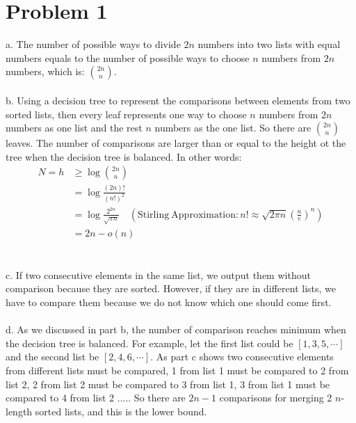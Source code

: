 \documentclass[twoside,11pt]{homework}
\begin{document}
\maketitle

\section*{Problem 1}
a. The number of possible ways to divide $2n$ numbers into two lists with equal numbers equals to the number of possible ways to choose $n$ numbers from $2n$ numbers, which is:
$\binom{2n}{n}$.
\\\\
b. Using a decision tree to represent the comparisons between elements from two sorted lists, then every leaf represents one way to choose $n$ numbers from $2n$ numbers as one list and the rest $n$ numbers as the one list.
So there are $\binom{2n}{n}$ leaves.
The number of comparisons are larger than or equal to the height ot the tree when the decision tree is balanced.
In other words:
%
\begin{equation}
\begin{split}
N = h & \ge \log \binom{2n}{n} \\
	&= \log \frac{(2n)!}{(n!)^2} \\
	&= \log \frac{2^{2n}}{\sqrt{\pi n }} \quad (\mathrm{Stirling\ Approximation}:  n! \approx \sqrt{2\pi n} (\frac{n}{e})^n) \\
	&= 2n - o(n)
\end{split}
\end{equation}
%
\\\\
c. If two consecutive elements in the same list, we output them without comparison because they are sorted.
However, if they are in different lists, we have to compare them because we do not know which one should come first.
\\\\
d. As we discussed in part b, the number of comparison reaches minimum when the decision tree is balanced. 
For example, let the first list could be $[1,3,5, \cdots]$ and the second list be $[2, 4, 6, \cdots]$.
As part c shows two consecutive elements from different lists must be compared, 1 from list 1 must be compared to 2 from list 2, 2 from list 2 must be compared to 3 from list 1,  3 from list 1 must be compared to 4 from list 2 .....
So there are $2n-1$ comparisons for merging 2 $n$-length sorted lists, and this is the lower bound.

\end{document}

